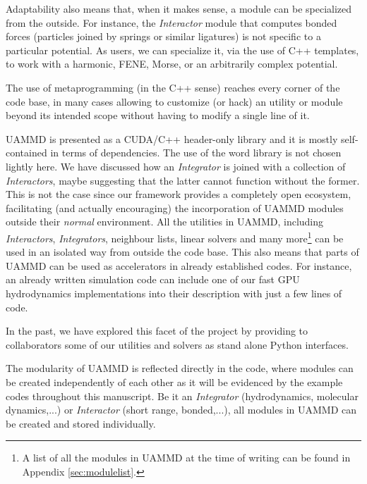 \documentclass[ twoside,openright,titlepage,numbers=noenddot,%
headinclude,footinclude,cleardoublepage=empty,abstract=on,
BCOR=5mm,paper=a4,fontsize=11pt, dvipsnames
]{scrreprt}
\newcommand{\uammd}{\gls{UAMMD}\xspace}
\newcommand{\gpu}{\gls{GPU}\xspace}
\begin{document}
Adaptability also means that, when it makes sense, a module can be specialized from the outside. For instance, the \emph{Interactor} module that computes bonded forces (particles joined by springs or similar ligatures) is not specific to a particular potential. As users, we can specialize it, via the use of C++ templates, to work with a harmonic, FENE\cite{Warner1972}, Morse\cite{Morse1929}, or an arbitrarily complex potential.

The use of metaprogramming (in the C++ sense) reaches every corner of the code base, in many cases allowing to customize (or hack) an utility or module beyond its intended scope without having to modify a single line of it.

\uammd is presented as a CUDA/C++ header-only library and it is mostly self-contained in terms of dependencies. The use of the word library is not chosen lightly here. We have discussed how an \emph{Integrator} is joined with a collection of \emph{Interactors}, maybe suggesting that the latter cannot function without the former. This is not the case since our framework provides a completely open ecosystem, facilitating (and actually encouraging) the incorporation of \uammd modules outside their \emph{normal} environment.
All the utilities in \uammd, including \emph{Interactors}, \emph{Integrators}, neighbour lists, linear solvers and many more\footnote{A list of all the modules in \uammd at the time of writing can be found in Appendix \ref{sec:modulelist}.} can be used in an isolated way from outside the code base. This also means that parts of \uammd can be used as accelerators in already established codes. For instance, an already written simulation code can include one of our fast \gpu hydrodynamics implementations into their description with just a few lines of code.

In the past, we have explored this facet of the project by providing to collaborators some of our utilities and solvers as stand alone Python interfaces.

The modularity of \uammd is reflected directly in the code, where modules can be created independently of each other as it will be evidenced by the example codes throughout this manuscript.
Be it an \emph{Integrator} (hydrodynamics, molecular dynamics,...) or \emph{Interactor} (short range, bonded,...), all modules in \uammd can be created and stored individually.
\end{document}
